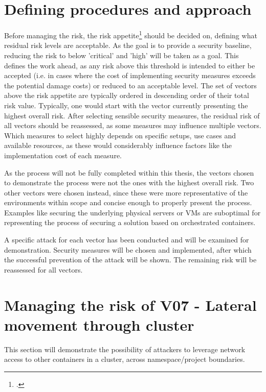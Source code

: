 \section{Defining procedures and approach} \label{riskMgmtApproach}
Before managing the risk, the risk appetite\footcite[][, first paragraph]{riskAppetite} should be decided on, defining what residual risk levels are acceptable.
As the goal is to provide a security baseline, reducing the risk to below 'critical' and 'high' will be taken as a goal.
This defines the work ahead, as any risk above this threshold is intended to either be accepted (i.e. in cases where the cost of implementing security measures exceeds the potential damage costs) or reduced to an acceptable level.
The set of vectors above the risk appetite are typically ordered in descending order of their total risk value.
Typically, one would start with the vector currently presenting the highest overall risk. 
After selecting sensible security measures, the residual risk of all vectors should be reassessed, as some measures may influence multiple vectors. 
Which measures to select highly depends on specific setups, use cases and available resources, as these would considerably influence factors like the implementation cost of each measure.

As the process will not be fully completed within this thesis, the vectors chosen to demonstrate the process were not the ones with the highest overall risk.
Two other vectors were chosen instead, since these were more representative of the environments within scope and concise enough to properly present the process. Examples like securing the underlying physical servers or VMs are suboptimal for representing the process of securing a solution based on orchestrated containers.

A specific attack for each vector has been conducted and will be examined for demonstration. Security measures will be chosen and implemented, after which the successful prevention of the attack will be shown.
The remaining risk will be reassessed for all vectors.

\section{Managing the risk of V07 - Lateral movement through cluster}
This section will demonstrate the possibility of attackers to leverage network access to other containers in a cluster, across namespace/project boundaries.

